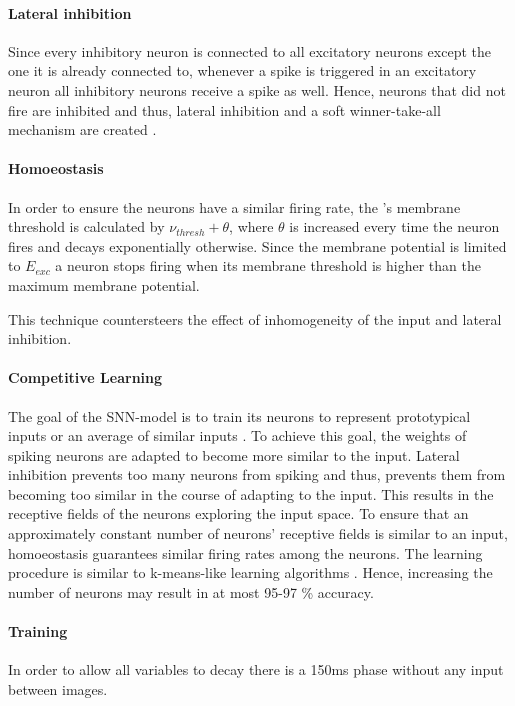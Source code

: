 \vspace{-3mm}
\paragraph{\textbf{Lateral inhibition}}
Since every inhibitory neuron is connected to all excitatory neurons except the one it is already connected to, 
whenever a spike is triggered in an excitatory neuron all inhibitory neurons receive a spike as well.
Hence, neurons that did not fire are inhibited and thus, lateral inhibition and a soft winner-take-all mechanism are created \cite{SNN}.

\vspace{-3mm}
\paragraph{\textbf{Homoeostasis}}
In order to ensure the neurons have a similar firing rate, the \eN{}'s membrane threshold is calculated by $\nu_{thresh} + \theta$, 
where $\theta$ is increased every time the neuron fires and decays exponentially otherwise.
Since the membrane potential is limited to $E_{exc}$ a neuron stops firing when its membrane threshold is higher than the maximum membrane potential.

This technique countersteers the effect of inhomogeneity of the input and lateral inhibition.

\vspace{-3mm}
\paragraph{\textbf{Competitive Learning}}
The goal of the \ac{SNN}-model is to train its neurons to represent prototypical inputs or an average of similar inputs \cite{SNN}.
To achieve this goal, the weights of spiking neurons are adapted to become more similar to the input.
Lateral inhibition prevents too many neurons from spiking and thus, prevents them from becoming too similar in the course of adapting to the input.
This results in the receptive fields of the neurons exploring the input space.
To ensure that an approximately constant number of neurons' receptive fields is similar to an input, 
homoeostasis guarantees similar firing rates among the neurons.
The learning procedure is similar to k-means-like learning algorithms \cite{SNN}.
Hence, increasing the number of neurons may result in at most 95-97 \% accuracy.

\vspace{-3mm}
\paragraph{\textbf{Training}}
In order to allow all variables to decay there is a 150ms phase without any input between images.

